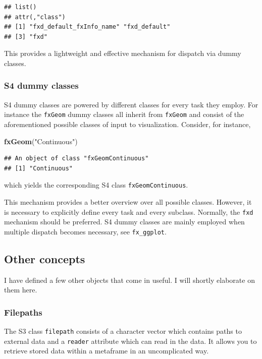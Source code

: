 \documentclass[]{report}
\newenvironment{Shaded}{\begin{snugshade}}{\end{snugshade}}
\newcommand{\KeywordTok}[1]{\textcolor[rgb]{0.13,0.29,0.53}{\textbf{#1}}}
\newcommand{\StringTok}[1]{\textcolor[rgb]{0.31,0.60,0.02}{#1}}
\newcommand{\NormalTok}[1]{#1}
\theoremstyle{definition}
\theoremstyle{definition}
\theoremstyle{definition}
\theoremstyle{remark}
\begin{document}
\begin{verbatim}
## list()
## attr(,"class")
## [1] "fxd_default_fxInfo_name" "fxd_default"            
## [3] "fxd"
\end{verbatim}

This provides a lightweight and effective mechanism for dispatch via
dummy classes.

\subsubsection{S4 dummy classes}\label{s4-dummy-classes}

S4 dummy classes are powered by different classes for every task they
employ. For instance the \texttt{fxGeom} dummy classes all inherit from
\texttt{fxGeom} and consist of the aforementioned possible classes of
input to visualization. Consider, for instance,

\begin{Shaded}
\begin{Highlighting}[]
\KeywordTok{fxGeom}\NormalTok{(}\StringTok{"Continuous"}\NormalTok{)}
\end{Highlighting}
\end{Shaded}

\begin{verbatim}
## An object of class "fxGeomContinuous"
## [1] "Continuous"
\end{verbatim}

which yields the corresponding S4 class \texttt{fxGeomContinuous}.

This mechanism provides a better overview over all possible classes.
However, it is necessary to explicitly define every task and every
subclass. Normally, the \texttt{fxd} mechanism should be preferred. S4
dummy classes are mainly employed when multiple dispatch becomes
necessary, see \texttt{fx\_ggplot}.

\subsection{Other concepts}\label{other-concepts}

I have defined a few other objects that come in useful. I will shortly
elaborate on them here.

\subsubsection{Filepaths}\label{filepaths}

The S3 class \texttt{filepath} consists of a character vector which
contains paths to external data and a \texttt{reader} attribute which
can read in the data. It allows you to retrieve stored data within a
metaframe in an uncomplicated way.
\end{document}
